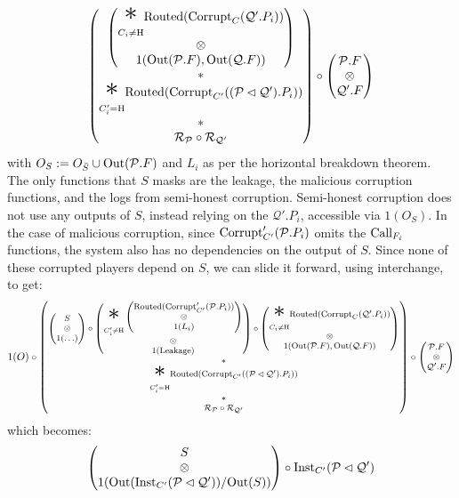 \begin{theorem}
$$\begin{pmatrix}
\begin{pmatrix}
    {\displaystyle \bigast_{C_i \neq \tx{H}}}
    \tx{Routed}(\tx{Corrupt}_C(\mathcal{Q}'.P_i))
    \cr
    \otimes\cr
    1(\tx{Out}(\mathcal{P}.F), \tx{Out}(\mathcal{Q}.F))
    \end{pmatrix}
    \cr
    *\cr
    {\displaystyle \bigast_{C'_i = \tx{H}}}
    \tx{Routed}(\tx{Corrupt}_{C'}((\mathcal{P} \lhd \mathcal{Q}').P_i))\cr
    *\cr
    \mathcal{R}_{\mathcal{P}} \circ \mathcal{R}_{\mathcal{Q}'}\cr
  \end{pmatrix}
  \circ
  \begin{pmatrix}
    \mathcal{P}.F\cr
    \otimes\cr
    \mathcal{Q}'.F
  \end{pmatrix}
  $$
  with $O_S := O_{\bar{S}} \cup \text{Out}(\mathcal{P}.F)$ and $L_i$ as per the horizontal breakdown theorem.
  The only functions that $S$ masks are the leakage, the malicious corruption
  functions, and the logs from semi-honest corruption.
  Semi-honest corruption does not use any outputs of $S$,
  instead relying on the $\mathcal{Q}'.P_i$, accessible via $1(O_S)$.
  In the case of malicious corruption, since $\text{Corrupt}'_{C'}(\mathcal{P}.P_i)$
  omits the $\text{Call}_{F_i}$ functions, the system also has no dependencies
  on the output of $S$.
  Since none of these corrupted players depend on $S$,
  we can slide it forward, using interchange, to get:
  $$
  \footnotesize
  1(O) \circ
  \begin{pmatrix}
    \begin{pmatrix}
      S\cr
      \otimes\cr
      1(\ldots)
    \end{pmatrix}
    \circ
    \begin{pmatrix}
    {\displaystyle \bigast_{C'_i \neq \tx{H}}}
    \begin{pmatrix}
      \tx{Routed}(\tx{Corrupt}'_{C'}(\mathcal{P}.P_i))\cr
      \otimes\cr
      1(L_i)
    \end{pmatrix}\cr
    \otimes\cr
    1(\tx{Leakage})
    \end{pmatrix}
    \circ
    \begin{pmatrix}
    {\displaystyle \bigast_{C_i \neq \tx{H}}}
    \tx{Routed}(\tx{Corrupt}_C(\mathcal{Q}'.P_i))
    \cr
    \otimes\cr
    1(\tx{Out}(\mathcal{P}.F), \tx{Out}(\mathcal{Q}.F))
    \end{pmatrix}
    \cr
    *\cr
    {\displaystyle \bigast_{C'_i = \tx{H}}}
    \tx{Routed}(\tx{Corrupt}_{C'}((\mathcal{P} \lhd \mathcal{Q}').P_i))\cr
    *\cr
    \mathcal{R}_{\mathcal{P}} \circ \mathcal{R}_{\mathcal{Q}'}\cr
  \end{pmatrix}
  \circ
  \begin{pmatrix}
    \mathcal{P}.F\cr
    \otimes\cr
    \mathcal{Q}'.F
  \end{pmatrix}
  $$
  which becomes:
  $$
  \begin{pmatrix}
    S\cr
    \otimes\cr
    1(\text{Out}(\text{Inst}_{C'}(\mathcal{P} \lhd \mathcal{Q}')) / \text{Out}(S))
  \end{pmatrix}
  \circ
  \text{Inst}_{C'}(\mathcal{P} \lhd \mathcal{Q}')
  $$


\end{theorem}

